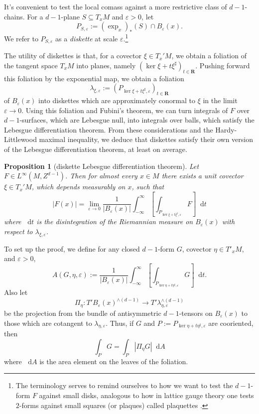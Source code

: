 \documentclass[reqno,11pt]{amsart}
\newcommand{\RR}{\mathbf{R}}
\newcommand*\dif{\mathop{}\!\mathrm{d}}
\newcommand{\dfn}[1]{\emph{#1}\index{#1}}
\newtheorem{proposition}[theorem]{Proposition}
\theoremstyle{definition}
\numberwithin{equation}{section}
\begin{document}
It's convenient to test the local comass against a more restrictive class of $d- 1$-chains.
For a $d-1$-plane $S \subseteq T_x M$ and $\varepsilon > 0$, let
$$P_{S, \varepsilon} := (\exp_x)_*(S) \cap B_\varepsilon(x).$$
We refer to $P_{S, \varepsilon}$ as a \dfn{diskette} at scale $\varepsilon$.\footnote{The terminology serves to remind ourselves to how we want to test the $d - 1$-form $F$ against small disks, analogous to how in lattice gauge theory one tests $2$-forms against small squares (or plaques) called plaquettes \cite{Gupta98}.}

The utility of diskettes is that, for a covector $\xi \in T_x' M$, we obtain a foliation of the tangent space $T_x M$ into planes, namely $(\ker \xi + t\xi^\sharp)_{t \in \RR}$.
Pushing forward this foliation by the exponential map, we obtain a foliation
$$\lambda_{\xi, \varepsilon} := (P_{\ker \xi + t\xi^\sharp, \varepsilon})_{t \in \RR}$$
of $B_\varepsilon(x)$ into diskettes which are approximately conormal to $\xi$ in the limit $\varepsilon \to 0$.
Using this foliation and Fubini's theorem, we can turn integrals of $F$ over $d-1$-surfaces, which are Lebesgue null, into integrals over balls, which satisfy the Lebesgue differentiation theorem.
From these considerations and the Hardy-Littlewood maximal inequality, we deduce that diskettes satisfy their own version of the Lebesgue differentiation theorem, at least on average.

\begin{proposition}[diskette Lebesgue differentiation theorem]\label{PLDT}
Let $F \in L^\infty(M, Z^{d - 1})$.
Then for almost every $x \in M$ there exists a unit covector $\xi \in T_x' M$, which depends measurably on $x$, such that
\begin{equation}\label{diskette LDT}
|F(x)| = \lim_{\varepsilon \to 0} \frac{1}{|B_\varepsilon(x)|} \int_{-\infty}^\infty \left[\int_{P_{\ker \xi + t\xi^\sharp, \varepsilon}} F\right] \dif t
\end{equation}
where $\dif t$ is the disintegration of the Riemannian measure on $B_\varepsilon(x)$ with respect to $\lambda_{\xi, \varepsilon}$.
\end{proposition}

To set up the proof, we define for any closed $d - 1$-form $G$, covector $\eta \in T'_x M$, and $\varepsilon > 0$,
$$A(G, \eta, \varepsilon) := \frac{1}{|B_\varepsilon(x)|} \int_{-\infty}^\infty \left[\int_{P_{\ker \eta + t\eta^\sharp, \varepsilon}} G\right] \dif t.$$
Also let 
$$\Pi_\eta: T' B_\varepsilon(x)^{\wedge (d - 1)} \to T' \lambda_{\eta, \varepsilon}^{\wedge (d - 1)}$$
be the projection from the bundle of antisymmetric $d - 1$-tensors on $B_\varepsilon(x)$ to those which are cotangent to $\lambda_{\eta, \varepsilon}$.
Thus, if $G$ and $P := P_{\ker \eta + t\eta^\sharp, \varepsilon}$ are cooriented, then
\begin{equation}\label{cooriented integral is area integral of norm}
	\int_P G = \int_P |\Pi_\eta G| \dif A
\end{equation}
where $\dif A$ is the area element on the leaves of the foliation.
\end{document}
